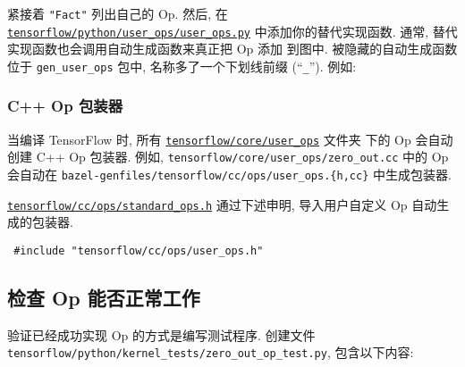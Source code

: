 紧接着 \texttt{"Fact"} 列出自己的 Op. 然后, 在
\href{https://tensorflow.googlesource.com/tensorflow/+/master/tensorflow/python/user_ops/user_ops.py}{\texttt{tensorflow/python/user\_ops/user\_ops.py}}
中添加你的替代实现函数. 通常, 替代实现函数也会调用自动生成函数来真正把
Op 添加 到图中. 被隐藏的自动生成函数位于 \texttt{gen\_user\_ops} 包中,
名称多了一个下划线前缀 (``\texttt{\_}''). 例如:

\begin{Shaded}
\begin{Highlighting}[]
 
     
\end{Highlighting}
\end{Shaded}

\subsubsection{C++ Op 包装器 }\label{c-op-ux5305ux88c5ux5668}

当编译 TensorFlow 时, 所有
\href{https://tensorflow.googlesource.com/tensorflow/+/master/tensorflow/core/user_ops/}{\texttt{tensorflow/core/user\_ops}}
文件夹 下的 Op 会自动创建 C++ Op 包装器. 例如,
\texttt{tensorflow/core/user\_ops/zero\_out.cc} 中的 Op 会自动在
\texttt{bazel-genfiles/tensorflow/cc/ops/user\_ops.\{h,cc\}}
中生成包装器.

\href{https://tensorflow.googlesource.com/tensorflow/+/master/tensorflow/cc/ops/standard_ops.h}{\texttt{tensorflow/cc/ops/standard\_ops.h}}
通过下述申明, 导入用户自定义 Op 自动生成的包装器.

\begin{verbatim}
 #include "tensorflow/cc/ops/user_ops.h"
\end{verbatim}

\subsection{检查 Op 能否正常工作
}\label{ux68c0ux67e5-op-ux80fdux5426ux6b63ux5e38ux5de5ux4f5c}

验证已经成功实现 Op 的方式是编写测试程序. 创建文件
\texttt{tensorflow/python/kernel\_tests/zero\_out\_op\_test.py},
包含以下内容:

\begin{Shaded}
\begin{Highlighting}[]
  
 
   \NormalTok{):}
     
      \OperatorTok{=} \NormalTok{tf.user_ops.zero_out([}\NormalTok{, }\NormalTok{, }\NormalTok{, }\NormalTok{, }\NormalTok{])}
      \NormalTok{(), [}\NormalTok{, }\NormalTok{, }\NormalTok{, }\NormalTok{, }\NormalTok{])}
\end{Highlighting}
\end{Shaded}

